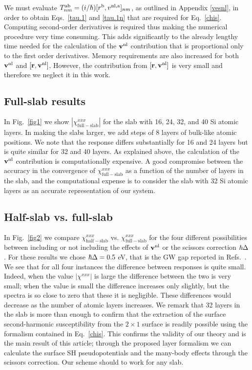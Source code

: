 \documentclass[floatfix,prb,aps,superscriptaddress,11pt,preprint,letterpaper]{revtex4}
\begin{document}
We must evaluate 
$T^{\mathrm{a}\mathrm{b}}_{nm}=(i/\hbar)[r^{\mathrm{b}},v^{\mathrm{nl},\mathrm{a}}]_{nm}$,
as outlined in Appendix \ref{vesnl},
in order to obtain 
Eqs.~\eqref{tau.1} and \eqref{tau.1n} that are required for 
Eq.~\eqref{chis}.
Computing second-order 
derivatives is required thus making the numerical procedure very 
time consuming. This adds significantly to the already lengthy time needed 
for the calculation of the $\mathbf{v}^{\mathrm{nl}}$ contribution that is
proportional only to 
the first order derivatives. 
Memory requirements are also increased for both $\mathbf{v}^{\mathrm{nl}}$ and 
$[\mathbf{r},\mathbf{v}^{\mathrm{nl}}]$. However, the contribution from $[\mathbf{r},\mathbf{v}^{\mathrm{nl}}]$ 
is very small\cite{valerie} and therefore we neglect it in this work.

\subsection{Full-slab results}\label{fsresults}

In Fig.~\ref{fig1} we show $|\chi_{\mathrm{full-slab}}^{xxx}|$
for the slab with
16, 24, 32, and 40 Si atomic layers. 
In making the slabs larger, we add steps of 8 layers of bulk-like atomic positions. 
We note that the response differs substantially 
for 16 and 24 layers but is quite similar for 32 and 40 layers.
As explained above,
the calculation of the $\mathbf{v}^{\mathrm{nl}}$ contribution is 
computationally expensive.
A good compromise between the accuracy in the convergence of
$\chi^{xxx}_{\mathrm{full-slab}}$ as a function of the number
of layers in the slab, and the computational 
expense is to consider
the slab with 32 Si atomic layers as 
an accurate representation of our 
system.

\subsection{Half-slab vs. full-slab}

In Fig.~\ref{fig2}
we compare 
$\chi^{xxx}_{\mathrm{half-slab}}$  
vs. 
$\chi^{xxx}_{\mathrm{full-slab}}$ 
for the four different possibilities 
between including or not including the
effects of $\mathbf{v}^{\mathrm{nl}}$ or the scissors correction
$\hbar\Delta$.   
For these results we chose
$\hbar\Delta=0.5$ eV, that is the GW gap reported in
Refs.~. 
We see that for all four instances the 
difference between responses is quite small.
Indeed, when the value $|\chi^{xxx}|$ 
is large the difference between the two is very small; 
when the value is small the difference increases only slightly, 
but the spectra is so close to zero that these it is negligible. 
These differences would decrease as the number of atomic layers 
increases. We remark that 32 layers in the slab is more than enough 
to confirm that the extraction of the surface second-harmonic 
susceptibility from the $2\times 1$ surface is readily possible 
using the formalism contained in Eq.~\eqref{chis}.
This confirms the validity of our theory and is the main result of
this article; through the proposed layer formalism we can calculate the surface SH
pseudopotentials
and the many-body effects through the scissors correction.
Our scheme should to work for any slab.  
\end{document}
